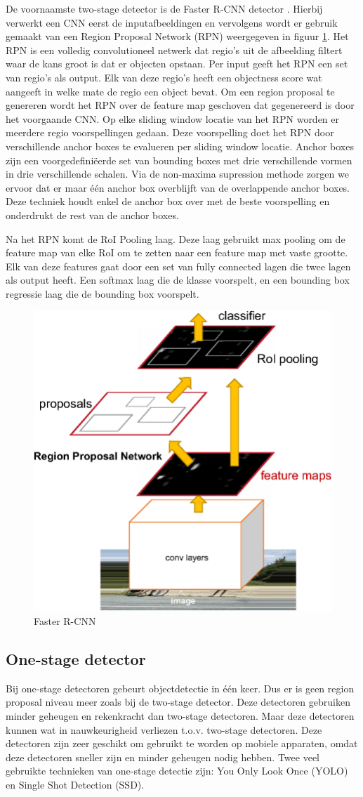 De voornaamste two-stage detector is de Faster R-CNN detector \cite{ren_faster_2016}. 
Hierbij verwerkt een CNN eerst de inputafbeeldingen en vervolgens wordt er gebruik gemaakt van een Region Proposal Network (RPN) weergegeven in figuur \ref{fig:faster-r-cnn}. 
Het RPN is een volledig convolutioneel netwerk dat regio's uit de afbeelding filtert waar de kans groot is dat er objecten opstaan.
Per input geeft het RPN een set van regio's als output.
Elk van deze regio's heeft een objectness score wat aangeeft in welke mate de regio een object bevat.
Om een region proposal te genereren wordt het RPN over de feature map geschoven dat gegenereerd is door het voorgaande CNN.
Op elke sliding window locatie van het RPN worden er meerdere regio voorspellingen gedaan.
Deze voorspelling doet het RPN door verschillende anchor boxes te evalueren per sliding window locatie.
Anchor boxes zijn een voorgedefini\"eerde set van bounding boxes met drie verschillende vormen in drie verschillende schalen.
Via de non-maxima supression methode zorgen we ervoor dat er maar \'e\'en anchor box overblijft van de overlappende anchor boxes. 
Deze techniek houdt enkel de anchor box over met de beste voorspelling en onderdrukt de rest van de anchor boxes.

Na het RPN komt de RoI Pooling laag.
Deze laag gebruikt max pooling om de feature map van elke RoI om te zetten naar een feature map met vaste grootte.
Elk van deze features gaat door een set van fully connected lagen die twee lagen als output heeft.
Een softmax laag die de klasse voorspelt, en een bounding box regressie laag die de bounding box voorspelt.

\begin{figure}[!ht]
    \centering
 	\includegraphics[width=0.35\linewidth]{fig/Faster-R-CNN.png}
 	\caption{Faster R-CNN}
 	\label{fig:faster-r-cnn}
\end{figure}

\subsection{One-stage detector}
Bij one-stage detectoren gebeurt objectdetectie in \'e\'en keer. 
Dus er is geen region proposal niveau meer zoals bij de two-stage detector. 
Deze detectoren gebruiken minder geheugen en rekenkracht dan two-stage detectoren.
Maar deze detectoren kunnen wat in nauwkeurigheid verliezen t.o.v. two-stage detectoren.
Deze detectoren zijn zeer geschikt om gebruikt te worden op mobiele apparaten, omdat deze detectoren sneller zijn en minder geheugen nodig hebben.
Twee veel gebruikte technieken van one-stage detectie zijn: You Only Look Once (YOLO) en Single Shot Detection (SSD).

